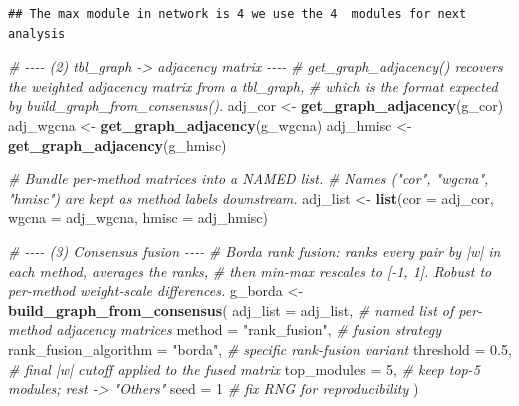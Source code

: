 \documentclass[
]{book}
\newenvironment{Shaded}{\begin{snugshade}}{\end{snugshade}}
\newcommand{\AttributeTok}[1]{\textcolor[rgb]{0.13,0.29,0.53}{#1}}
\newcommand{\CommentTok}[1]{\textcolor[rgb]{0.56,0.35,0.01}{\textit{#1}}}
\newcommand{\DecValTok}[1]{\textcolor[rgb]{0.00,0.00,0.81}{#1}}
\newcommand{\FloatTok}[1]{\textcolor[rgb]{0.00,0.00,0.81}{#1}}
\newcommand{\FunctionTok}[1]{\textcolor[rgb]{0.13,0.29,0.53}{\textbf{#1}}}
\newcommand{\NormalTok}[1]{#1}
\newcommand{\OtherTok}[1]{\textcolor[rgb]{0.56,0.35,0.01}{#1}}
\newcommand{\StringTok}[1]{\textcolor[rgb]{0.31,0.60,0.02}{#1}}
\begin{document}
\begin{verbatim}
## The max module in network is 4 we use the 4  modules for next analysis
\end{verbatim}

\begin{Shaded}
\begin{Highlighting}[]
\CommentTok{\# {-}{-}{-}{-} (2) tbl\_graph {-}\textgreater{} adjacency matrix {-}{-}{-}{-}}
\CommentTok{\# \textasciigrave{}get\_graph\_adjacency()\textasciigrave{} recovers the weighted adjacency matrix from a tbl\_graph,}
\CommentTok{\# which is the format expected by build\_graph\_from\_consensus().}
\NormalTok{adj\_cor   }\OtherTok{\textless{}{-}} \FunctionTok{get\_graph\_adjacency}\NormalTok{(g\_cor)}
\NormalTok{adj\_wgcna }\OtherTok{\textless{}{-}} \FunctionTok{get\_graph\_adjacency}\NormalTok{(g\_wgcna)}
\NormalTok{adj\_hmisc }\OtherTok{\textless{}{-}} \FunctionTok{get\_graph\_adjacency}\NormalTok{(g\_hmisc)}

\CommentTok{\# Bundle per{-}method matrices into a NAMED list.}
\CommentTok{\# Names ("cor", "wgcna", "hmisc") are kept as method labels downstream.}
\NormalTok{adj\_list }\OtherTok{\textless{}{-}} \FunctionTok{list}\NormalTok{(}\AttributeTok{cor =}\NormalTok{ adj\_cor, }\AttributeTok{wgcna =}\NormalTok{ adj\_wgcna, }\AttributeTok{hmisc =}\NormalTok{ adj\_hmisc)}

\CommentTok{\# {-}{-}{-}{-} (3) Consensus fusion {-}{-}{-}{-}}
\CommentTok{\# Borda rank fusion: ranks every pair by |w| in each method, averages the ranks,}
\CommentTok{\# then min{-}max rescales to [{-}1, 1]. Robust to per{-}method weight{-}scale differences.}
\NormalTok{g\_borda }\OtherTok{\textless{}{-}} \FunctionTok{build\_graph\_from\_consensus}\NormalTok{(}
  \AttributeTok{adj\_list              =}\NormalTok{ adj\_list,        }\CommentTok{\# named list of per{-}method adjacency matrices}
  \AttributeTok{method                =} \StringTok{"rank\_fusion"}\NormalTok{,   }\CommentTok{\# fusion strategy}
  \AttributeTok{rank\_fusion\_algorithm =} \StringTok{"borda"}\NormalTok{,         }\CommentTok{\# specific rank{-}fusion variant}
  \AttributeTok{threshold             =} \FloatTok{0.5}\NormalTok{,             }\CommentTok{\# final |w| cutoff applied to the fused matrix}
  \AttributeTok{top\_modules           =} \DecValTok{5}\NormalTok{,               }\CommentTok{\# keep top{-}5 modules; rest {-}\textgreater{} "Others"}
  \AttributeTok{seed                  =} \DecValTok{1}                \CommentTok{\# fix RNG for reproducibility}
\NormalTok{)}
\end{Highlighting}
\end{Shaded}
\end{document}
